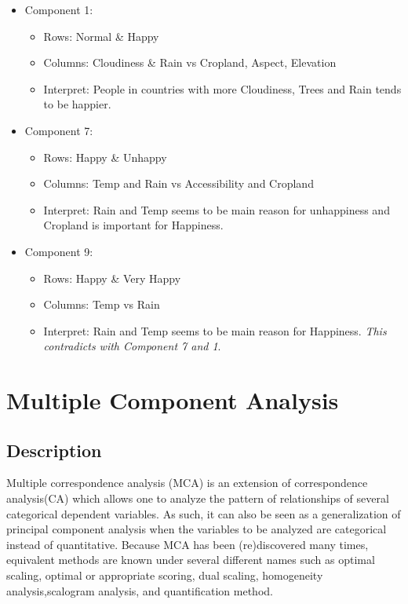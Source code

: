\documentclass[]{book}
\providecommand{\tightlist}{%
  \setlength{\itemsep}{0pt}\setlength{\parskip}{0pt}}
\begin{document}
\begin{itemize}
\tightlist
\item
  Component 1:

  \begin{itemize}
  \tightlist
  \item
    Rows: Normal \& Happy
  \item
    Columns: Cloudiness \& Rain vs Cropland, Aspect, Elevation
  \item
    Interpret: People in countries with more Cloudiness, Trees and Rain
    tends to be happier.
  \end{itemize}
\item
  Component 7:

  \begin{itemize}
  \tightlist
  \item
    Rows: Happy \& Unhappy
  \item
    Columns: Temp and Rain vs Accessibility and Cropland
  \item
    Interpret: Rain and Temp seems to be main reason for unhappiness and
    Cropland is important for Happiness.
  \end{itemize}
\item
  Component 9:

  \begin{itemize}
  \tightlist
  \item
    Rows: Happy \& Very Happy
  \item
    Columns: Temp vs Rain
  \item
    Interpret: Rain and Temp seems to be main reason for Happiness.
    \emph{This contradicts with Component 7 and 1}.
  \end{itemize}
\end{itemize}

\hypertarget{multiple-component-analysis}{%
\chapter{Multiple Component
Analysis}\label{multiple-component-analysis}}

\hypertarget{description-1}{%
\section{Description}\label{description-1}}

Multiple correspondence analysis (MCA) is an extension of correspondence
analysis(CA) which allows one to analyze the pattern of relationships of
several categorical dependent variables. As such, it can also be seen as
a generalization of principal component analysis when the variables to
be analyzed are categorical instead of quantitative. Because MCA has
been (re)discovered many times, equivalent methods are known under
several different names such as optimal scaling, optimal or appropriate
scoring, dual scaling, homogeneity analysis,scalogram analysis, and
quantiﬁcation method.
\end{document}
